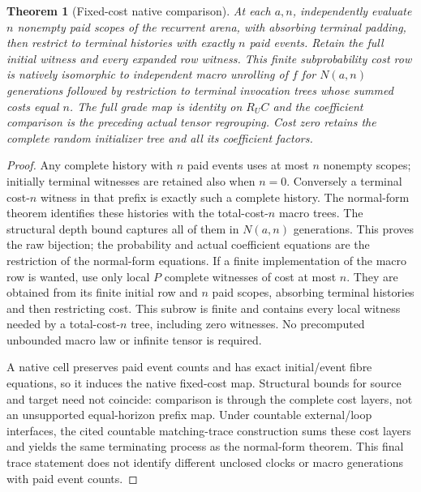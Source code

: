 \documentclass[11pt]{article}
\newtheorem{theorem}{Theorem}\newtheorem{definition}{Definition}
\begin{document}
\begin{theorem}[Fixed-cost native comparison]
At each $a,n$, independently evaluate $n$ nonempty paid scopes of the recurrent arena,
with absorbing terminal padding, then restrict to terminal histories with
exactly $n$ paid events. Retain the full initial witness and every expanded
row witness. This finite subprobability cost row is natively isomorphic to
independent macro unrolling of $f$ for $N(a,n)$ generations followed by
restriction to terminal invocation trees whose summed costs equal $n$.
The full grade map is identity on $R_U C$ and the coefficient comparison is
the preceding actual tensor regrouping. Cost zero retains the complete
random initializer tree and all its coefficient factors.
\end{theorem}
\begin{proof}
Any complete history with $n$ paid events uses at most $n$ nonempty scopes;
initially terminal witnesses are retained also when $n=0$. Conversely a
terminal cost-$n$ witness in that prefix is exactly such a complete history.
The normal-form theorem identifies these histories with the total-cost-$n$
macro trees. The structural depth bound captures all of them in $N(a,n)$
generations. This proves the raw bijection; the probability and actual
coefficient equations are the restriction of the normal-form equations.
If a finite implementation of the macro row is wanted, use only local
$P$ complete witnesses of cost at most $n$. They are obtained from its finite
initial row and $n$ paid scopes, absorbing terminal histories and then
restricting cost. This subrow is finite and contains every local witness
needed by a total-cost-$n$ tree, including zero witnesses. No precomputed
unbounded macro law or infinite tensor is required.

A native cell preserves paid event counts and has exact initial/event fibre
equations, so it induces the native fixed-cost map. Structural bounds for
source and target need not coincide: comparison is through the complete
cost layers, not an unsupported equal-horizon prefix map. Under countable
external/loop interfaces, the cited countable matching-trace construction
sums these cost layers and yields the same terminating process as the
normal-form theorem. This final trace statement does not identify different
unclosed clocks or macro generations with paid event counts.
\end{proof}
\end{document}
